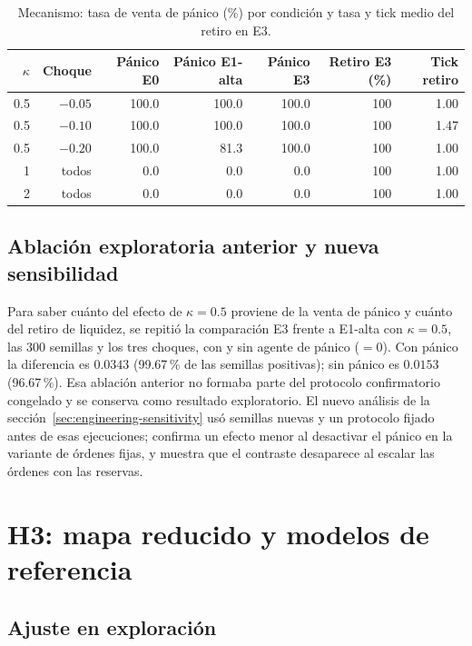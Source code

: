 \begin{table}[htbp]
\centering
\caption{Mecanismo: tasa de venta de pánico (\%) por condición y tasa y tick medio del retiro en E3.}
\label{tab:mecanismo}
\small
\begin{tabular}{@{}rrrrrrr@{}}
\toprule
$\kappa$ & Choque & Pánico E0 & Pánico E1-alta & Pánico E3 & Retiro E3 (\%) & Tick retiro \\
\midrule
0.5 & $-0.05$ & 100.0 & 100.0 & 100.0 & 100 & 1.00 \\
0.5 & $-0.10$ & 100.0 & 100.0 & 100.0 & 100 & 1.47 \\
0.5 & $-0.20$ & 100.0 & 81.3 & 100.0 & 100 & 1.00 \\
1 & todos & 0.0 & 0.0 & 0.0 & 100 & 1.00 \\
2 & todos & 0.0 & 0.0 & 0.0 & 100 & 1.00 \\
\bottomrule
\end{tabular}
\end{table}

\subsection{Ablación exploratoria anterior y nueva sensibilidad}

Para saber cuánto del efecto de $\kappa=0.5$ proviene de la venta de pánico y cuánto del retiro de liquidez, se repitió la comparación E3 frente a E1-alta con $\kappa=0.5$, las 300 semillas y los tres choques, con y sin agente de pánico ($=0$). Con pánico la diferencia es $0.0343$ (99.67\,\% de las semillas positivas); sin pánico es $0.0153$ (96.67\,\%). Esa ablación anterior no formaba parte del protocolo confirmatorio congelado y se conserva como resultado exploratorio. El nuevo análisis de la sección~\ref{sec:engineering-sensitivity} usó semillas nuevas y un protocolo fijado antes de esas ejecuciones; confirma un efecto menor al desactivar el pánico en la variante de órdenes fijas, y muestra que el contraste desaparece al escalar las órdenes con las reservas.

\section{H3: mapa reducido y modelos de referencia}
\label{sec:res-h3}

\subsection{Ajuste en exploración}

